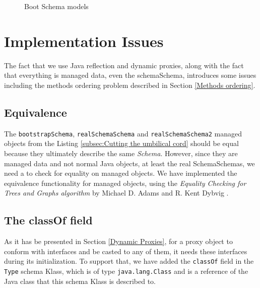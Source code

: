 \begin{figure}[H]
	\centering
  	\caption{Boot Schema models}
  	\label{fig:schema_schema_models}
\end{figure}

\section{Implementation Issues}\label{Implementation Issues}
The fact that we use Java reflection and dynamic proxies, along with the fact that everything is managed data, even the schemaSchema, introduces some issues including the methods ordering problem described in Section \ref{Methods ordering}.

\subsection{Equivalence}\label{Managed Object equivalence}
The \texttt{bootstrapSchema}, \texttt{realSchemaSchema} and \texttt{realSchemaSchema2} managed objects from the Listing \ref{subsec:Cutting the umbilical cord} should be equal because they ultimately describe the same \textit{Schema}.
However, since they are managed data and not normal Java objects, at least the real SchemaSchemas, we need a to check for equality on managed objects.
We have implemented the equivalence functionality for managed objects, using the \textit{Equality Checking for Trees and Graphs
algorithm} by Michael D. Adams and R. Kent Dybvig \cite{adams2008efficient}.

\subsection{The classOf field}\label{The classOf field}
As it has be presented in Section \ref{Dynamic Proxies}, for a proxy object to conform with interfaces and be casted to any of them, it needs these interfaces during its initialization.
To support that, we have added the \texttt{classOf} field in the \texttt{Type} schema Klass, which is of type \texttt{java.lang.Class} and is a reference of the Java class that this schema Klass is described to.

